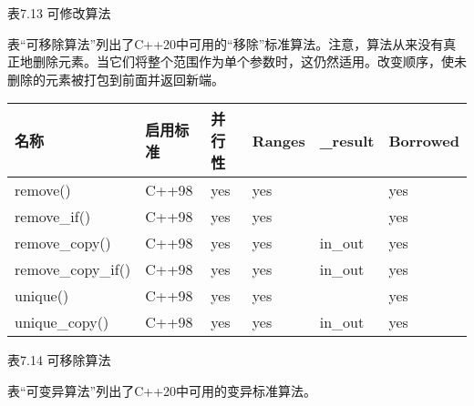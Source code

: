 \begin{center}
表7.13 可修改算法
\end{center}

表“可移除算法”列出了C++20中可用的“移除”标准算法。注意，算法从来没有真正地删除元素。当它们将整个范围作为单个参数时，这仍然适用。改变顺序，使未删除的元素被打包到前面并返回新端。


\begin{longtable}[c]{|l|l|l|l|l|l|}
\hline
\textbf{名称} & \textbf{启用标准} & \textbf{并行性} & \textbf{Ranges} & \textbf{\_result} & \textbf{Borrowed} \\ \hline
\endfirsthead
%
\endhead
%
remove()           & C++98 & yes & yes &         & yes \\ \hline
remove\_if()       & C++98 & yes & yes &         & yes \\ \hline
remove\_copy()     & C++98 & yes & yes & in\_out & yes \\ \hline
remove\_copy\_if() & C++98 & yes & yes & in\_out & yes \\ \hline
unique()           & C++98 & yes & yes &         & yes \\ \hline
unique\_copy()     & C++98 & yes & yes & in\_out & yes \\ \hline
\end{longtable}

\begin{center}
表7.14 可移除算法
\end{center}

表“可变异算法”列出了C++20中可用的变异标准算法。

